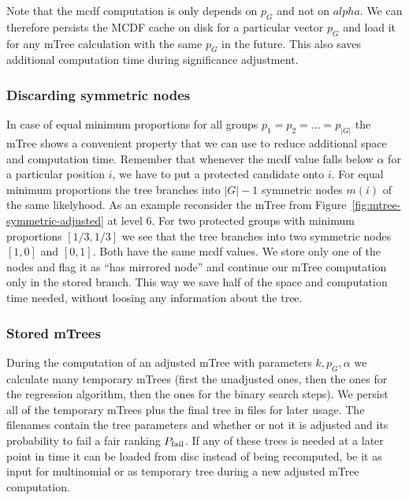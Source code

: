 Note that the mcdf computation is only depends on $p_G$ and not on $alpha$. 
%
We can therefore persists the MCDF cache on disk for a particular vector $p_G$ and load it for any mTree calculation with the same $p_G$ in the future.
%
This also saves additional computation time during significance adjustment.

\subsubsection{Discarding symmetric nodes}
\label{subsubsec:discarding-symmetric-nodes}
In case of equal minimum proportions for all groups $p_1 = p_2 = \ldots = p_|G|$ the mTree shows a convenient property that we can use to reduce additional space and computation time. 
%
Remember that whenever the mcdf value falls below $\alpha$ for a particular position $i$, we have to put a protected candidate onto $i$. 
%
For equal minimum proportions the tree branches into $|G| - 1$ symmetric nodes $m(i)$ of the same likelyhood.
%
As an example reconsider the mTree from Figure~\ref{fig:mtree-symmetric-adjusted} at level 6. 
%
For two protected groups with minimum proportions $[1/3, 1/3]$ we see that the tree branches into two symmetric nodes $[1, 0]$ and $[0,1]$. 
%
Both have the same mcdf values.
%
We store only one of the nodes and flag it as ``has mirrored node'' and continue our mTree computation only in the stored branch.
%
This way we save half of the space and computation time needed, without loosing any information about the tree. 

\subsubsection{Stored mTrees}
\label{subsubsec:stored-mtrees}
During the computation of an adjusted mTree with parameters $k,p_G , \alpha$ we calculate many temporary mTrees (first the unadjusted ones, then the ones for the regression algorithm, then the ones for the binary search steps).
%
We persist all of the temporary mTrees plus the final tree in files for later usage.
%
The filenames contain the tree parameters and whether or not it is adjusted and its probability to fail a fair ranking $P_{\operatorname{fail}}$.
%
If any of these trees is needed at a later point in time it can be loaded from disc instead of being recomputed, be it as input for multinomial \algoFAIR or as temporary tree during a new adjusted mTree computation.




